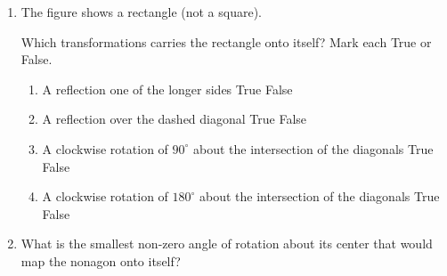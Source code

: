 \documentclass[12pt, twoside]{article}
\begin{document}
\begin{enumerate}
  \item The figure shows a rectangle (not a square).
   \begin{center}
   \end{center}
   Which transformations carries the rectangle onto itself? Mark each True or False.
     \begin{enumerate}
       \item A reflection one of the longer sides \hfill True \quad False
       \item A reflection over the dashed diagonal \hfill True \quad False
       \item A clockwise rotation of $90^\circ$ about the intersection of the diagonals \hfill True \quad False
       \item A clockwise rotation of $180^\circ$ about the intersection of the diagonals \hfill True \quad False
     \end{enumerate}
     \vspace{1cm}

   \item What is the smallest non-zero angle of rotation about its center that would map the nonagon onto itself? \vspace{0.25cm} %
   \begin{center}
    \end{center}

\end{enumerate}
\newpage
\setcounter{page}{1}
\end{document}
